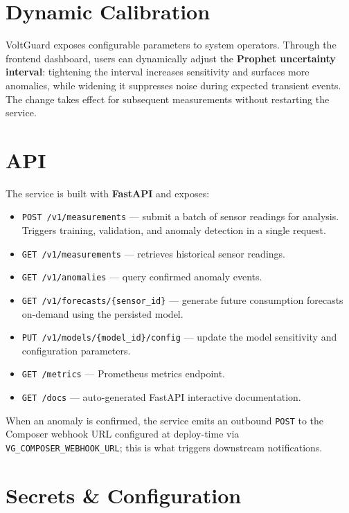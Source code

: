 \documentclass[12pt,a4paper,oneside]{report}
\begin{document}
\section{Dynamic Calibration}

VoltGuard exposes configurable parameters to system operators. Through the frontend dashboard, users can dynamically adjust the \textbf{Prophet uncertainty interval}: tightening the interval increases sensitivity and surfaces more anomalies, while widening it suppresses noise during expected transient events. The change takes effect for subsequent measurements without restarting the service.

\section{API}
\label{sec:anomaly-api}

The service is built with \textbf{FastAPI} and exposes:

\begin{itemize}[noitemsep]
  \item \texttt{POST /v1/measurements} — submit a batch of sensor readings for analysis. Triggers training, validation, and anomaly detection in a single request.
  \item \texttt{GET /v1/measurements} — retrieves historical sensor readings.
  \item \texttt{GET /v1/anomalies} — query confirmed anomaly events.
  \item \texttt{GET /v1/forecasts/\{sensor\_id\}} — generate future consumption forecasts on-demand using the persisted model.
  \item \texttt{PUT /v1/models/\{model\_id\}/config} — update the model sensitivity and configuration parameters.
  \item \texttt{GET /metrics} — Prometheus metrics endpoint.
  \item \texttt{GET /docs} — auto-generated FastAPI interactive documentation.
\end{itemize}

When an anomaly is confirmed, the service emits an outbound \texttt{POST} to the Composer webhook URL configured at deploy-time via \texttt{VG\_COMPOSER\_WEBHOOK\_URL}; this is what triggers downstream notifications.

\section{Secrets \& Configuration}
\end{document}
